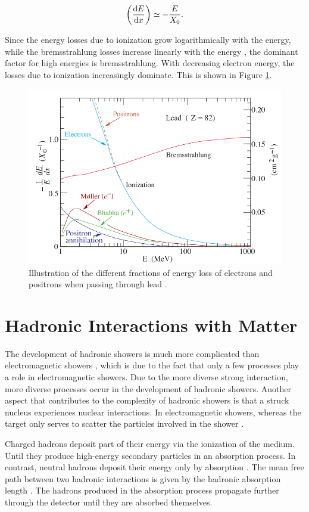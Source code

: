 \documentclass[12pt, a4paper]{thesis}
\begin{document}
\begin{align}
\left( \dv{E}{x} \right) \simeq - \frac{E}{X_0}.
\end{align}

Since the energy losses due to ionization grow logarithmically with
the energy, while the bremsstrahlung losses increase linearly with the
energy \cite{PhysRevD.98.030001}, the dominant factor for high
energies is bremsstrahlung. With decreasing electron energy, the
losses due to ionization increasingly dominate. This is shown in
Figure \ref{bremsstrahlung}.

\begin{figure}[H]
\centering
\includegraphics[width=0.8 \textwidth]{../images/bremsstrahlung.png}
\caption{ Illustration of the different fractions of energy loss of
  electrons and positrons when passing through lead
  \cite{PhysRevD.98.030001}.}
\label{bremsstrahlung}
\end{figure}

\section{Hadronic Interactions with Matter}
\label{sec:org39e1a53}

The development of hadronic showers is much more complicated than
electromagnetic showers \cite{wigman18}, which is due to the fact that
only a few processes play a role in electromagnetic showers.  Due to
the more diverse strong interaction, more diverse processes occur in
the development of hadronic showers. Another aspect that contributes
to the complexity of hadronic showers is that a struck nucleus
experiences nuclear interactions. In electromagnetic showers, whereas
the target only serves to scatter the particles involved in the shower
\cite{wigman18}.

Charged hadrons deposit part of their energy via the ionization of the
medium. Until they produce high-energy secondary particles in an absorption
process.  In contrast, neutral hadrons deposit their energy only by absorption
\cite{wigman18,fabjan03}. The mean free path between two hadronic interactions is
given by the hadronic absorption length \cite{fabjan03}. The hadrons produced in
the absorption process propagate further through the detector until they are
absorbed themselves.
\end{document}
